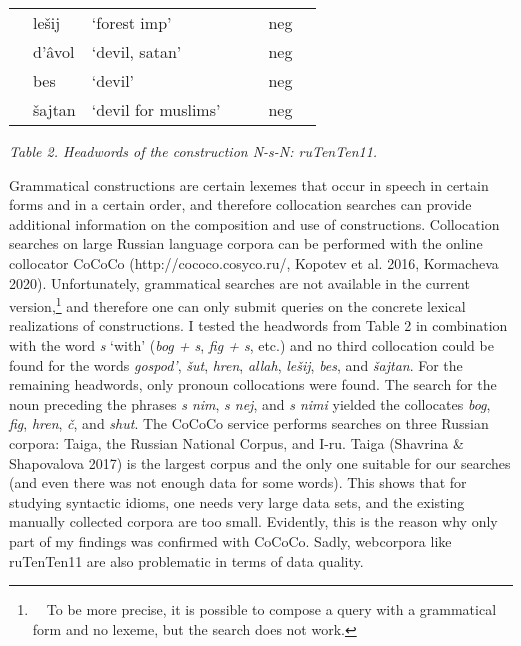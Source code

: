 \documentclass[12pt]{article}
\newenvironment{styleStandard}{\setlength\leftskip{0cm}\setlength\rightskip{0cm plus 1fil}\setlength\parindent{0cm}\setlength\parfillskip{0pt plus 1fil}\setlength\parskip{0in plus 1pt}\writerlistparindent\writerlistleftskip\leavevmode\normalfont\normalsize\writerlistlabel\ignorespaces}{\unskip\vspace{0.111in plus 0.0111in}\par}
\newenvironment{stylecaption}{\setlength\leftskip{0cm}\setlength\rightskip{0cm plus 1fil}\setlength\parindent{0cm}\setlength\parfillskip{0pt plus 1fil}\setlength\parskip{0.0835in plus 0.00835in}\writerlistparindent\writerlistleftskip\leavevmode\normalfont\normalsize\fontsize{10pt}{12.0pt}\selectfont\itshape\writerlistlabel\ignorespaces}{\unskip\vspace{0.0835in plus 0.00835in}\par}
\newcommand\writerlistleftskip{}
\newcommand\writerlistparindent{}
\newcommand\writerlistlabel{}
\begin{document}
\begin{flushleft}
\begin{supertabular}{m{0.6309598in}m{0.6295598in}m{0.7073598in}m{0.35735986in}m{0.43025985in}m{0.79065984in}m{0.62615985in}}
{\mdseries {}} &
{\mdseries lešij} &
{\mdseries ‘forest imp’} &
{} &
{} &
{\mdseries neg} &
{}\\
{\mdseries {}} &
{\mdseries d’âvol} &
{\mdseries ‘devil, satan’} &
{} &
{} &
{\mdseries neg} &
{}\\
{\mdseries {}} &
{\mdseries bes} &
{\mdseries ‘devil’} &
{} &
{} &
{\mdseries neg} &
{}\\
{\mdseries {}} &
{\mdseries šajtan} &
{\mdseries ‘devil for muslims’} &
{} &
{} &
{\mdseries neg} &
{}\\
\end{supertabular}
\end{flushleft}
\begin{stylecaption}
Table 2. Headwords of the construction N-s-N: ruTenTen11.
\end{stylecaption}

\begin{styleStandard}
Grammatical constructions are certain lexemes that occur in speech in certain forms and in a certain order, and therefore collocation searches can provide additional information on the composition and use of constructions. Collocation searches on large Russian language corpora can be performed with the online collocator CoCoCo (http://cococo.cosyco.ru/, Kopotev et al. 2016, Kormacheva 2020). Unfortunately, grammatical searches are not available in the current version,\footnote{\ \ To be more precise, it is possible to compose a query with a grammatical form and no lexeme, but the search does not work.} and therefore one can only submit queries on the concrete lexical realizations of constructions. I tested the headwords from Table 2 in combination with the word \textit{s} ‘with’ (\textit{bog + s},\textit{ fig + s}, etc.) and no third collocation could be found for the words \textit{gospod’},\textit{ šut},\textit{ hren},\textit{ allah},\textit{ lešij},\textit{ bes},\textit{ }and\textit{ šajtan}. For the remaining headwords, only pronoun collocations were found. The search for the noun preceding the phrases \textit{s nim},\textit{ s nej},\textit{ }and \textit{s nimi} yielded the collocates \textit{bog},\textit{ fig}, \textit{hren}, \textit{č},\textit{ }and\textit{ shut}. The CoCoCo service performs searches on three Russian corpora: Taiga, the Russian National Corpus, and I-ru. Taiga (Shavrina \& Shapovalova 2017) is the largest corpus and the only one suitable for our searches (and even there was not enough data for some words). This shows that for studying syntactic idioms, one needs very large data sets, and the existing manually collected corpora are too small. Evidently, this is the reason why only part of my findings was confirmed with CoCoCo. Sadly, webcorpora like ruTenTen11 are also problematic in terms of data quality.
\end{styleStandard}
\end{document}
